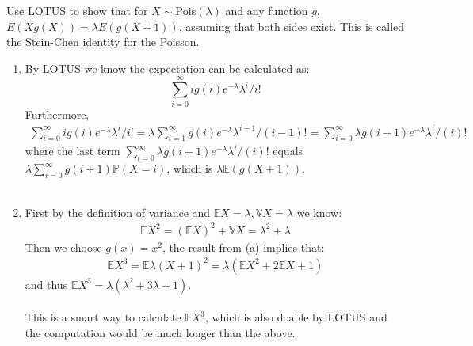 
\setcounter{theorem}{29}
\begin{exercise} [BH.4.30] Use LOTUS to show that for $X \sim \text{Pois}(\lambda)$ and any function $g$, $E(X g(X)) = \lambda E(g(X + 1))$, assuming that both sides exist. This is called the Stein-Chen identity for the Poisson.
\begin{solution}
    \begin{enumerate}
        \item By LOTUS we know the expectation can be calculated as: 
        $$	\sum_{i=0}^\infty ig(i) e^{-\lambda} \lambda^i/i! $$
        Furthermore,
        \begin{align*}
            \sum_{i=0}^\infty ig(i) e^{-\lambda} \lambda^i/i! = 	\lambda \sum_{i=1}^\infty g(i) e^{-\lambda} \lambda^{i-1}/(i-1)!= 	 \sum_{i=0}^\infty \lambda g(i+1) e^{-\lambda} \lambda^{i}/(i)!  
        \end{align*}
        where the last term $ \sum_{i=0}^\infty \lambda g(i+1) e^{-\lambda} \lambda^{i}/(i)!  $ equals $\lambda \sum_{i=0}^\infty  g(i+1) \mathbb{P}(X=i)$, which is $\lambda\mathbb{E}\left(g(X+1)\right)$.\\~\\
        \item First by the definition of variance  and $\mathbb{E}X=\lambda, \mathbb{V}X=\lambda$ we know:
        \begin{align*}
            \mathbb{E}X^2 = (\mathbb{E}X)^2 +\mathbb{V}X =\lambda^2 +\lambda
        \end{align*}
        Then we choose $g(x)=x^2$, the result from (a) implies that: 
        \begin{align*}
            \mathbb{E}X^3= \mathbb{E}\lambda (X+1)^2 = \lambda\left(\mathbb{E}X^2 +2\mathbb{E}X +1  \right)    
        \end{align*}
        and thus $\mathbb{E}X^3 = \lambda (\lambda^2+3\lambda +1).$\\~~\\
        This is a smart way to calculate $\mathbb{E}X^3$, which is also doable by LOTUS and the computation would be much longer than the above.
    \end{enumerate}
\end{solution}
\end{exercise}

